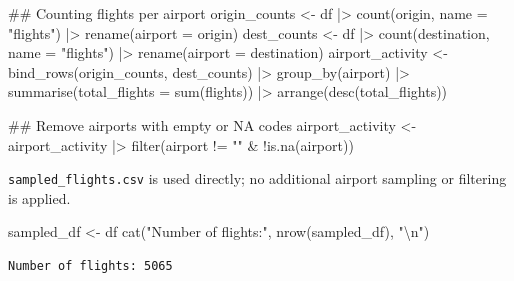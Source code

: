 \documentclass[
  letterpaper,
]{report}
\newenvironment{Shaded}{}{}
\newcommand{\AttributeTok}[1]{\textcolor[rgb]{0.84,0.23,0.29}{#1}}
\newcommand{\DocumentationTok}[1]{\textcolor[rgb]{0.42,0.45,0.49}{#1}}
\newcommand{\FunctionTok}[1]{\textcolor[rgb]{0.44,0.26,0.76}{#1}}
\newcommand{\NormalTok}[1]{\textcolor[rgb]{0.14,0.16,0.18}{#1}}
\newcommand{\OtherTok}[1]{\textcolor[rgb]{0.44,0.26,0.76}{#1}}
\newcommand{\SpecialCharTok}[1]{\textcolor[rgb]{0.00,0.36,0.77}{#1}}
\newcommand{\StringTok}[1]{\textcolor[rgb]{0.01,0.18,0.38}{#1}}
\begin{document}
\begin{Shaded}
\begin{Highlighting}[]
\DocumentationTok{\#\# Counting flights per airport}
\NormalTok{origin\_counts }\OtherTok{\textless{}{-}}\NormalTok{ df }\SpecialCharTok{|\textgreater{}} \FunctionTok{count}\NormalTok{(origin, }\AttributeTok{name =} \StringTok{"flights"}\NormalTok{) }\SpecialCharTok{|\textgreater{}} \FunctionTok{rename}\NormalTok{(}\AttributeTok{airport =}\NormalTok{ origin)}
\NormalTok{dest\_counts }\OtherTok{\textless{}{-}}\NormalTok{ df }\SpecialCharTok{|\textgreater{}} \FunctionTok{count}\NormalTok{(destination, }\AttributeTok{name =} \StringTok{"flights"}\NormalTok{) }\SpecialCharTok{|\textgreater{}} \FunctionTok{rename}\NormalTok{(}\AttributeTok{airport =}\NormalTok{ destination)}
\NormalTok{airport\_activity }\OtherTok{\textless{}{-}} \FunctionTok{bind\_rows}\NormalTok{(origin\_counts, dest\_counts) }\SpecialCharTok{|\textgreater{}}
  \FunctionTok{group\_by}\NormalTok{(airport) }\SpecialCharTok{|\textgreater{}}
  \FunctionTok{summarise}\NormalTok{(}\AttributeTok{total\_flights =} \FunctionTok{sum}\NormalTok{(flights)) }\SpecialCharTok{|\textgreater{}}
  \FunctionTok{arrange}\NormalTok{(}\FunctionTok{desc}\NormalTok{(total\_flights))}

\DocumentationTok{\#\# Remove airports with empty or NA codes}
\NormalTok{airport\_activity }\OtherTok{\textless{}{-}}\NormalTok{ airport\_activity }\SpecialCharTok{|\textgreater{}} \FunctionTok{filter}\NormalTok{(airport }\SpecialCharTok{!=} \StringTok{""} \SpecialCharTok{\&} \SpecialCharTok{!}\FunctionTok{is.na}\NormalTok{(airport))}
\end{Highlighting}
\end{Shaded}

\texttt{sampled\_flights.csv} is used directly; no additional airport
sampling or filtering is applied.

\begin{Shaded}
\begin{Highlighting}[]
\NormalTok{sampled\_df }\OtherTok{\textless{}{-}}\NormalTok{ df}
\FunctionTok{cat}\NormalTok{(}\StringTok{"Number of flights:"}\NormalTok{, }\FunctionTok{nrow}\NormalTok{(sampled\_df), }\StringTok{"}\SpecialCharTok{\textbackslash{}n}\StringTok{"}\NormalTok{)}
\end{Highlighting}
\end{Shaded}

\begin{verbatim}
Number of flights: 5065 
\end{verbatim}
\end{document}
